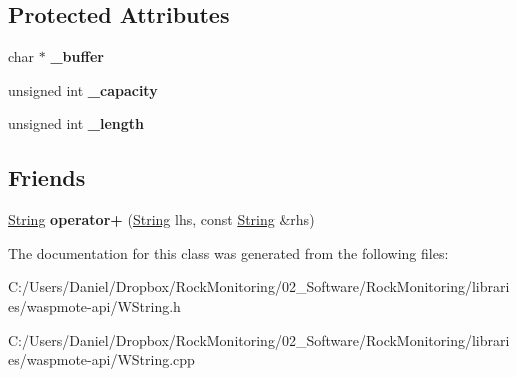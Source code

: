 \subsection*{Protected Attributes}
\begin{DoxyCompactItemize}
\item 
char $\ast$ {\bfseries \+\_\+buffer}\hypertarget{class_string_abccec894d931600e2428a1be15db0c83}{}\label{class_string_abccec894d931600e2428a1be15db0c83}

\item 
unsigned int {\bfseries \+\_\+capacity}\hypertarget{class_string_ae525e8ac0d02eaedd3b6e287df4ddcee}{}\label{class_string_ae525e8ac0d02eaedd3b6e287df4ddcee}

\item 
unsigned int {\bfseries \+\_\+length}\hypertarget{class_string_ad4ffdf5de1868afeae32a4b85cc20306}{}\label{class_string_ad4ffdf5de1868afeae32a4b85cc20306}

\end{DoxyCompactItemize}
\subsection*{Friends}
\begin{DoxyCompactItemize}
\item 
\hyperlink{class_string}{String} {\bfseries operator+} (\hyperlink{class_string}{String} lhs, const \hyperlink{class_string}{String} \&rhs)\hypertarget{class_string_a0ca7980da94bb8d8f70b8ef4b0b9edd7}{}\label{class_string_a0ca7980da94bb8d8f70b8ef4b0b9edd7}

\end{DoxyCompactItemize}


The documentation for this class was generated from the following files\+:\begin{DoxyCompactItemize}
\item 
C\+:/\+Users/\+Daniel/\+Dropbox/\+Rock\+Monitoring/02\+\_\+\+Software/\+Rock\+Monitoring/libraries/waspmote-\/api/W\+String.\+h\item 
C\+:/\+Users/\+Daniel/\+Dropbox/\+Rock\+Monitoring/02\+\_\+\+Software/\+Rock\+Monitoring/libraries/waspmote-\/api/W\+String.\+cpp\end{DoxyCompactItemize}
